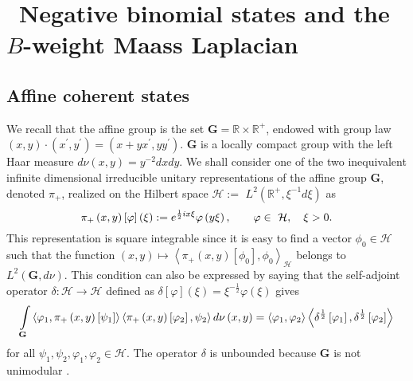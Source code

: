 \section{ {\ \textbf{Negative binomial states and the $B$-weight Maass Laplacian}}}

\subsection{Affine coherent states}

We recall that the affine group is the set $\mathbf{G}=\mathbb{R}\times 
\mathbb{R}^{+}$, endowed with group law $\left( x,y\right) \cdot \left(
x^{\prime },y^{\prime }\right) =\left( x+yx^{\prime },yy^{\prime }\right) $. 
$\mathbf{G}$ is a locally compact group with the left Haar measure $d\nu
\left( x,y\right) =y^{-2}dxdy$. We shall consider one of the two
inequivalent infinite dimensional irreducible unitary representations of the
affine group $\mathbf{G}$, denoted $\pi _{+}$, realized on the Hilbert space 
$\mathcal{H}:=$ $L^{2}\left( \mathbb{R}^{+},\xi ^{-1}d\xi \right) $ as 
\begin{equation}
\label{r4}
\pi _{+}\left( x,y\right) \left[ \varphi \right] \left( \xi \right) :=e^{%
\frac{1}{2}ix\xi }\varphi \left( y\xi \right) ,\qquad \varphi \in \mathcal{\
H},\quad \xi >0\text{.}  
\end{equation}
This representation is square integrable since it is easy to find a vector $%
\phi _{0}\in \mathcal{H}$ such that the function $\left( x,y\right) \mapsto
\left\langle \pi _{+}\left( x,y\right) \left[ \phi _{0}\right] ,\phi
_{0}\right\rangle _{\mathcal{H}}$ belongs to $L^{2}\left( \mathbf{G},d\nu
\right) $. This condition can also be expressed by saying that the
self-adjoint operator $\delta :\mathcal{H\rightarrow H}$ defined as $\delta %
\left[ \varphi \right] (\xi )=\xi ^{-\frac{1}{2}}\varphi \left( \xi \right) $
gives 
\begin{equation}
\label{r5}
\int\limits_{\mathbf{G}}\left\langle \varphi _{1},\pi _{+}\left( x,y\right) %
\left[ \psi _{1}\right] \right\rangle \left\langle \pi _{+}\left( x,y\right) %
\left[ \varphi _{2}\right] ,\psi _{2}\right\rangle d\nu \left( x,y\right)
=\left\langle \varphi _{1},\varphi _{2}\right\rangle \left\langle \delta ^{%
\frac{1}{2}}\left[ \varphi _{1}\right] ,\delta ^{\frac{1}{2}}\left[ \varphi
_{2}\right] \right\rangle  
\end{equation}
for all $\psi _{1},\psi _{2},\varphi _{1},\varphi _{2}\in \mathcal{H}$. The
operator $\delta $ is unbounded because $\mathbf{G}$ is not unimodular \cite{DMo}.

